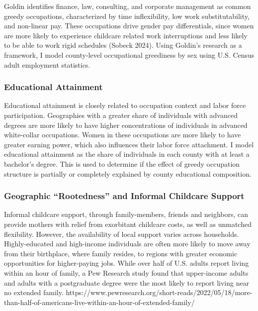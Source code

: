 \documentclass[
  letterpaper,
  DIV=11,
  numbers=noendperiod]{scrartcl}
\begin{document}
Goldin identifies finance, law, consulting, and corporate management as
common greedy occupations, characterized by time inflexibility, low work
substitutability, and non-linear pay. These occupations drive gender pay
differentials, since women are more likely to experience childcare
related work interruptions and less likely to be able to work rigid
schedules (Sobeck 2024). Using Goldin's research as a framework, I model
county-level occupational greediness by sex using U.S. Census adult
employment statistics.

\subsubsection{Educational Attainment}\label{educational-attainment}

Educational attainment is closely related to occupation context and
labor force participation. Geographies with a greater share of
individuals with advanced degrees are more likely to have higher
concentrations of individuals in advanced white-collar occupations.
Women in these occupations are more likely to have greater earning
power, which also influences their labor force attachment. I model
educational attainment as the share of individuals in each county with
at least a bachelor's degree. This is used to determine if the effect of
greedy occupation structure is partially or completely explained by
county educational composition.

\subsubsection{Geographic ``Rootedness'' and Informal Childcare
Support}\label{geographic-rootedness-and-informal-childcare-support}

Informal childcare support, through family-members, friends and
neighbors, can provide mothers with relief from exorbitant childcare
costs, as well as unmatched flexibility. However, the availability of
local support varies across households. Highly-educated and high-income
individuals are often more likely to move away from their birthplace,
where family resides, to regions with greater economic opportunities for
higher-paying jobs. While over half of U.S. adults report living within
an hour of family, a Pew Research study found that upper-income adults
and adults with a postgraduate degree were the most likely to report
living near no extended family.
https://www.pewresearch.org/short-reads/2022/05/18/more-than-half-of-americans-live-within-an-hour-of-extended-family/
\end{document}
